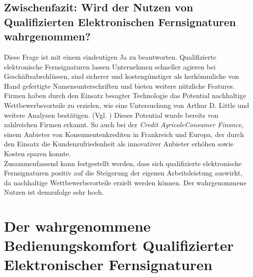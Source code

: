 \documentclass[deutsch]{lib/llncs/llncs}
\begin{document}
\subsection{Zwischenfazit: Wird der Nutzen von Qualifizierten Elektronischen Fernsignaturen wahrgenommen?}
Diese Frage ist mit einem eindeutigen Ja zu beantworten. Qualifizierte elektronische Fernsignaturen lassen Unternehmen schneller agieren bei Geschäftsabschlüssen, sind sicherer und kostengünstiger als herkömmliche von Hand gefertigte Namensunterschriften und bieten weitere nützliche Features. \\
Firmen haben durch den Einsatz besagter Technologie das Potential nachhaltige Wettbewerbsvorteile zu erzielen, wie eine Untersuchung von Arthur D. Little und weitere Analysen bestätigen. (Vgl. \cite[S. 7]{Zitat05})
Dieses Potential wurde bereits von zahlreichen Firmen erkannt. So auch bei der \textit{Credit AgricoleConsumer Finance}, einem Anbieter von Konsumentenkrediten in Frankreich und Europa, der durch den Einsatz die Kundenzufriedenheit als innovativer Anbieter erhöhen sowie Kosten sparen konnte. \cite[S. 13]{Zitat05} \\
Zusammenfassend kann festgestellt werden, dass sich qualifizierte elektronische Fernsignaturen positiv auf die Steigerung der eigenen Arbeitsleistung auswirkt, da nachhaltige Wettbewerbsvorteile erzielt werden können. Der wahrgenommene Nutzen ist demzufolge sehr hoch. 


\section{Der wahrgenommene Bedienungskomfort Qualifizierter Elektronischer Fernsignaturen}
\end{document}
